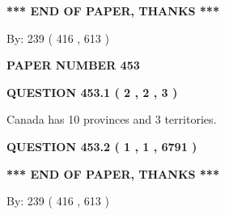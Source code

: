 \documentclass[12pt]{article}
\begin{document}
   
   
   
   
\vspace{1.0in} 
{\textbf{\large{ *** END OF PAPER, THANKS *** }}} 
   
   
\hspace{1.0in} By: 
 239 ( 416 ,  613 )
   
   
   
   
\newpage 
\setcounter{page}{ 
   453001 } 
   
   
   
   
 {\textbf{ \Large{ PAPER NUMBER  453  }}}
   
   
\vspace{0.2in}
   
   
   
   
   
   
 \vspace{0.2in}
 
 
 
 
   
   
  
\vspace{0.2in}
  
{\textbf{\Large{QUESTION
453.1 
 ( 2 , 2 , 3 )
}}}
  
  
 
 
\noindent{}
 
 
Canada has 10  provinces and 3 territories.
 
 
 
 
  
\vspace{0.2in}
  
{\textbf{\Large{QUESTION
453.2 
 ( 1 , 1 , 6791 )
}}}
  
  
   
   
 \vspace{0.2in}
 
   
   
   
   
\vspace{1.0in} 
{\textbf{\large{ *** END OF PAPER, THANKS *** }}} 
   
   
\hspace{1.0in} By: 
 239 ( 416 ,  613 )
   
   
   
   
\newpage 
\setcounter{page}{ 
   454001 } 
   
\end{document}
